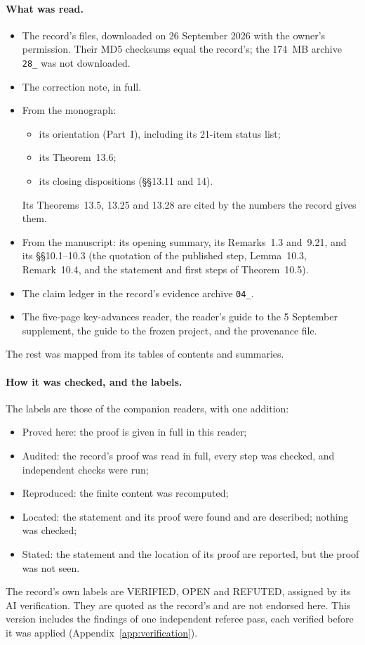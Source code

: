 \paragraph{What was read.}
\begin{itemize}
\item The record's files, downloaded on 26 September 2026 with the owner's permission. Their MD5 checksums equal the record's; the 174~MB archive \texttt{28\_} was not downloaded.
\item The correction note, in full.
\item From the monograph:
\begin{itemize}
\item its orientation (Part~I), including its 21-item status list;
\item its Theorem~13.6;
\item its closing dispositions (§§13.11 and 14).
\end{itemize}
Its Theorems~13.5, 13.25 and 13.28 are cited by the numbers the record gives them.
\item From the manuscript: its opening summary, its Remarks~1.3 and~9.21, and its §§10.1--10.3 (the quotation of the published step, Lemma~10.3, Remark~10.4, and the statement and first steps of Theorem~10.5).
\item The claim ledger in the record's evidence archive \texttt{04\_}.
\item The five-page key-advances reader, the reader's guide to the 5 September supplement, the guide to the frozen project, and the provenance file.
\end{itemize}
The rest was mapped from its tables of contents and summaries.

\paragraph{How it was checked, and the labels.}
The labels are those of the companion readers, with one addition:
\begin{itemize}
\item \textsf{Proved here}: the proof is given in full in this reader;
\item \textsf{Audited}: the record's proof was read in full, every step was checked, and independent checks were run;
\item \textsf{Reproduced}: the finite content was recomputed;
\item \textsf{Located}: the statement and its proof were found and are described; nothing was checked;
\item \textsf{Stated}: the statement and the location of its proof are reported, but the proof was not seen.
\end{itemize}
The record's own labels are \textsf{VERIFIED}, \textsf{OPEN} and \textsf{REFUTED}, assigned by its AI verification. They are quoted as the record's and are not endorsed here. This version includes the findings of one independent referee pass, each verified before it was applied (Appendix~\ref{app:verification}).
